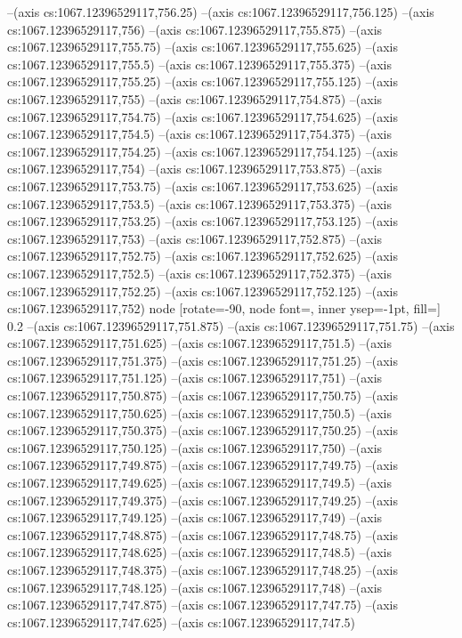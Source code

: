--(axis cs:1067.12396529117,756.25)
--(axis cs:1067.12396529117,756.125)
--(axis cs:1067.12396529117,756)
--(axis cs:1067.12396529117,755.875)
--(axis cs:1067.12396529117,755.75)
--(axis cs:1067.12396529117,755.625)
--(axis cs:1067.12396529117,755.5)
--(axis cs:1067.12396529117,755.375)
--(axis cs:1067.12396529117,755.25)
--(axis cs:1067.12396529117,755.125)
--(axis cs:1067.12396529117,755)
--(axis cs:1067.12396529117,754.875)
--(axis cs:1067.12396529117,754.75)
--(axis cs:1067.12396529117,754.625)
--(axis cs:1067.12396529117,754.5)
--(axis cs:1067.12396529117,754.375)
--(axis cs:1067.12396529117,754.25)
--(axis cs:1067.12396529117,754.125)
--(axis cs:1067.12396529117,754)
--(axis cs:1067.12396529117,753.875)
--(axis cs:1067.12396529117,753.75)
--(axis cs:1067.12396529117,753.625)
--(axis cs:1067.12396529117,753.5)
--(axis cs:1067.12396529117,753.375)
--(axis cs:1067.12396529117,753.25)
--(axis cs:1067.12396529117,753.125)
--(axis cs:1067.12396529117,753)
--(axis cs:1067.12396529117,752.875)
--(axis cs:1067.12396529117,752.75)
--(axis cs:1067.12396529117,752.625)
--(axis cs:1067.12396529117,752.5)
--(axis cs:1067.12396529117,752.375)
--(axis cs:1067.12396529117,752.25)
--(axis cs:1067.12396529117,752.125)
--(axis cs:1067.12396529117,752)
node [rotate=-90, node font=\tiny, inner ysep=-1pt, fill=\bgcol] {0.2}
--(axis cs:1067.12396529117,751.875)
--(axis cs:1067.12396529117,751.75)
--(axis cs:1067.12396529117,751.625)
--(axis cs:1067.12396529117,751.5)
--(axis cs:1067.12396529117,751.375)
--(axis cs:1067.12396529117,751.25)
--(axis cs:1067.12396529117,751.125)
--(axis cs:1067.12396529117,751)
--(axis cs:1067.12396529117,750.875)
--(axis cs:1067.12396529117,750.75)
--(axis cs:1067.12396529117,750.625)
--(axis cs:1067.12396529117,750.5)
--(axis cs:1067.12396529117,750.375)
--(axis cs:1067.12396529117,750.25)
--(axis cs:1067.12396529117,750.125)
--(axis cs:1067.12396529117,750)
--(axis cs:1067.12396529117,749.875)
--(axis cs:1067.12396529117,749.75)
--(axis cs:1067.12396529117,749.625)
--(axis cs:1067.12396529117,749.5)
--(axis cs:1067.12396529117,749.375)
--(axis cs:1067.12396529117,749.25)
--(axis cs:1067.12396529117,749.125)
--(axis cs:1067.12396529117,749)
--(axis cs:1067.12396529117,748.875)
--(axis cs:1067.12396529117,748.75)
--(axis cs:1067.12396529117,748.625)
--(axis cs:1067.12396529117,748.5)
--(axis cs:1067.12396529117,748.375)
--(axis cs:1067.12396529117,748.25)
--(axis cs:1067.12396529117,748.125)
--(axis cs:1067.12396529117,748)
--(axis cs:1067.12396529117,747.875)
--(axis cs:1067.12396529117,747.75)
--(axis cs:1067.12396529117,747.625)
--(axis cs:1067.12396529117,747.5)
